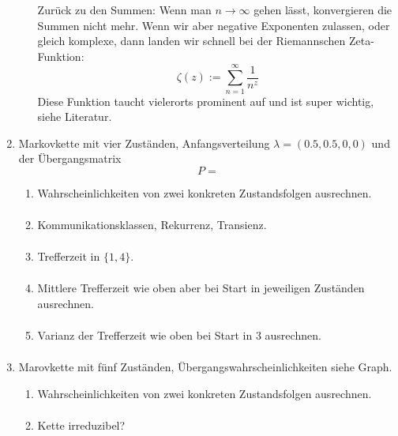 \documentclass[a4paper,11pt,notitlepage,fullpage]{article}
\begin{document}
\begin{enumerate}
\begin{enumerate}
Zurück zu den Summen: Wenn man $n\rightarrow \infty$ gehen lässt, konvergieren die Summen nicht mehr. Wenn wir aber negative Exponenten zulassen, oder gleich komplexe, dann landen wir schnell bei der Riemannschen Zeta-Funktion:
$$\zeta (z) := \sum_{n=1}^\infty \frac{1}{n^z}$$
Diese Funktion taucht vielerorts prominent auf und ist super wichtig, siehe Literatur.
\end{enumerate}

\item Markovkette mit vier Zuständen, Anfangsverteilung $\lambda = (0.5, 0.5, 0, 0)$ und der Übergangsmatrix
$$P=$$
\begin{enumerate}
\item Wahrscheinlichkeiten von zwei konkreten Zustandsfolgen ausrechnen.
\begin{align*}
\end{align*}

\item Kommunikationsklassen, Rekurrenz, Transienz.
\begin{align*}
\end{align*}

\item Trefferzeit in $\{1, 4\}$.
\begin{align*}
\end{align*}

\item Mittlere Trefferzeit wie oben aber bei Start in jeweiligen Zuständen ausrechnen.
\begin{align*}
\end{align*}

\item Varianz der Trefferzeit wie oben bei Start in $3$ ausrechnen.
\begin{align*}
\end{align*}
\end{enumerate}

\item Marovkette mit fünf Zuständen, Übergangswahrscheinlichkeiten siehe Graph.
\begin{enumerate}
\item Wahrscheinlichkeiten von zwei konkreten Zustandsfolgen ausrechnen.
\begin{align*}
\end{align*}

\item Kette irreduzibel?
\begin{align*}
\end{align*}


\end{enumerate}
\end{enumerate}
\end{document}
